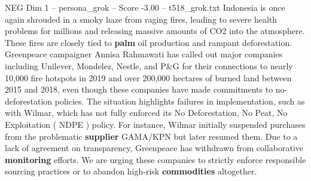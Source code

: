 \begin{textsample}{NEG Dim 1 – persona\_grok – Score -3.00 – t518\_grok.txt}  \label{ex:f1_neg_021}
Indonesia is once again shrouded in a smoky haze from raging fires, leading to severe health problems for millions and releasing massive amounts of CO2 into the atmosphere.
These fires are closely tied to \textbf{palm} oil production and rampant deforestation.
Greenpeace campaigner Annisa Rahmawati has called out major companies including Unilever, Mondelez, Nestle, and P\&G for their connections to nearly 10,000 fire hotspots in 2019 and over 200,000 hectares of burned land between 2015 and 2018, even though these companies have made commitments to no-deforestation policies.
The situation highlights failures in implementation, such as with Wilmar, which has not fully enforced its No Deforestation, No Peat, No Exploitation ( NDPE ) policy.
For instance, Wilmar initially suspended purchases from the problematic \textbf{supplier} GAMA/KPN but later resumed them.
Due to a lack of agreement on transparency, Greenpeace has withdrawn from collaborative \textbf{monitoring} efforts.
We are urging these companies to strictly enforce responsible sourcing practices or to abandon high-risk \textbf{commodities} altogether.

\end{textsample}
